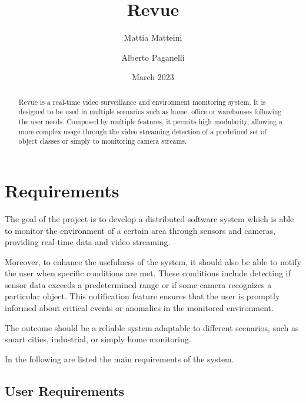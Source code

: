 \documentclass{scrartcl}
\title{
    Revue
}
\author{
    Mattia Matteini \\ \emailaddr{mattia.matteini@studio.unibo.it}
    \and
    Alberto Paganelli \\ \emailaddr{alberto.paganelli3@studio.unibo.it}
}
\date{March 2023}
\begin{document}
    \maketitle

    \begin{abstract}
        Revue is a real-time video surveillance and environment monitoring system.
        It is designed to be used in multiple scenarios such as home, office or warehouses following the user needs.
%
        Composed by multiple features, it permits high modularity, allowing a more complex usage through the video streaming detection of a predefined set of object classes or simply to monitoring camera streams.
    \end{abstract}


    \section{Requirements}

    The goal of the project is to develop a distributed software system which is able to monitor the environment
    of a certain area through sensors and cameras, providing real-time data and video streaming.

    Moreover, to enhance the usefulness of the system, it should also be able to notify the user when specific conditions are met.
    These conditions include detecting if sensor data exceeds a predetermined range or if some camera recognizes a particular object.
    This notification feature ensures that the user is promptly informed about critical
    events or anomalies in the monitored environment.

    The outcome should be a reliable system adaptable to different scenarios, such as smart cities, industrial, or
    simply home monitoring.

    In the following are listed the main requirements of the system.

    \subsection{User Requirements}\label{subsec:user-requirements}
\end{document}
